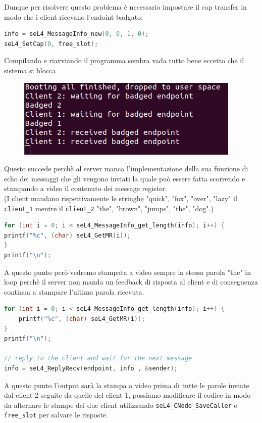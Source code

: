 Dunque per risolvere questo problema è necessario impostare il cap transfer in modo che i client ricevano l'endoint badgato:
\begin{lstlisting}[language=C++]
info = seL4_MessageInfo_new(0, 0, 1, 0);
seL4_SetCap(0, free_slot);
\end{lstlisting}
Compilando e riavviando il programma sembra vada tutto bene eccetto che il sistema si blocca
\begin{figure}[H]
  \includegraphics[width=\linewidth]{img/DopoBadgeIPC.png}
  \label{fig:AvvioDopoBedge}
\end{figure}
Questo succede perchè al server manca l'implementazione della sua funzione di echo dei messaggi che gli vengono inviati la quale può essere fatta scorrendo e stampando a video il contenuto dei message register.\\
(I client mandano rispettivamente le stringhe {"quick", "fox", "over", "lazy"} il \texttt{client\_1} mentre il \texttt{client\_2} {"the", "brown", "jumps", "the", "dog"}.)
\begin{lstlisting}[language=C++]
for (int i = 0; i < seL4_MessageInfo_get_length(info); i++) {
printf("%c", (char) seL4_GetMR(i));
}
printf("\n");
\end{lstlisting}
A questo punto però vedremo stampata a video sempre la stessa parola "the" in loop perchè il server non manda un feedback di risposta al client e di conseguenza continua a stampare l'ultima parola ricevuta.
\begin{lstlisting}[language=C++]
for (int i = 0; i < seL4_MessageInfo_get_length(info); i++) {
	printf("%c", (char) seL4_GetMR(i));
}
printf("\n");

// reply to the client and wait for the next message
info = seL4_ReplyRecv(endpoint, info , &sender);
\end{lstlisting}
A questo punto l'output sarà la stampa a video prima di tutte le parole inviate dal client 2 seguite da quelle del client 1, possiamo modificare il codice in modo da alternare le stampe dei due client utilizzando \texttt{seL4\_CNode\_SaveCaller} e \texttt{free\_slot} per salvare le risposte.
